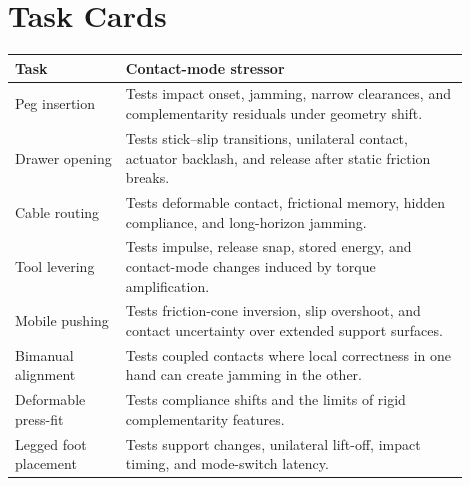 \documentclass{article}
\begin{document}
\section{Task Cards}
\begin{longtable}{p{0.22\linewidth}p{0.68\linewidth}}
\toprule
Task & Contact-mode stressor \\
\midrule
Peg insertion & Tests impact onset, jamming, narrow clearances, and complementarity residuals under geometry shift. \\
Drawer opening & Tests stick--slip transitions, unilateral contact, actuator backlash, and release after static friction breaks. \\
Cable routing & Tests deformable contact, frictional memory, hidden compliance, and long-horizon jamming. \\
Tool levering & Tests impulse, release snap, stored energy, and contact-mode changes induced by torque amplification. \\
Mobile pushing & Tests friction-cone inversion, slip overshoot, and contact uncertainty over extended support surfaces. \\
Bimanual alignment & Tests coupled contacts where local correctness in one hand can create jamming in the other. \\
Deformable press-fit & Tests compliance shifts and the limits of rigid complementarity features. \\
Legged foot placement & Tests support changes, unilateral lift-off, impact timing, and mode-switch latency. \\
\bottomrule
\end{longtable}
\end{document}
